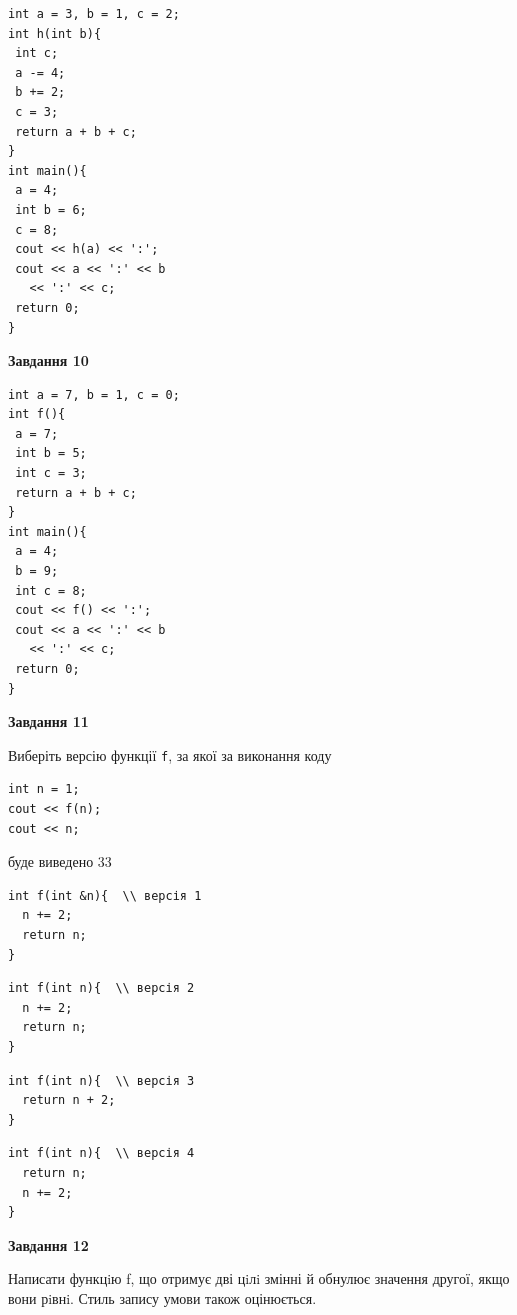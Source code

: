 \documentclass[12pt, ukrainian]{article}
\def\code#1{\Verb!#1!}
\begin{document}
{\begin {large}
\begin{minipage}[t]{7.0cm}
\begin{verbatim}
int a = 3, b = 1, c = 2;
int h(int b){
 int c;
 a -= 4;
 b += 2;
 c = 3;
 return a + b + c;
}
int main(){
 a = 4;
 int b = 6;
 c = 8;
 cout << h(a) << ':';
 cout << a << ':' << b 
   << ':' << c;
 return 0;
}
\end{verbatim}



\begin{center}
\textbf{Завдання 10}
\end{center}
\vspace{-8mm}

\begin{verbatim}
int a = 7, b = 1, c = 0;
int f(){
 a = 7;
 int b = 5;
 int c = 3;
 return a + b + c;
}
int main(){
 a = 4;
 b = 9;
 int c = 8;
 cout << f() << ':';
 cout << a << ':' << b 
   << ':' << c;
 return 0;
}
\end{verbatim}

\end{minipage}
\vline \hspace{1mm}
\begin{minipage}[t]{11.0cm}

\begin{center}
\textbf{Завдання 11}
\end{center}
Виберіть версію функції \code{f}, за якої за виконання коду
\begin{verbatim}
int n = 1;
cout << f(n);
cout << n;
\end{verbatim}

буде виведено 33

\begin{verbatim}
int f(int &n){  \\ версія 1
  n += 2;
  return n;
}
\end{verbatim}

\vspace{-8mm}\begin{verbatim}
int f(int n){  \\ версія 2
  n += 2;
  return n;
}
\end{verbatim}

\vspace{-8mm}\begin{verbatim}
int f(int n){  \\ версія 3
  return n + 2;
}
\end{verbatim}

\vspace{-8mm}\begin{verbatim}
int f(int n){  \\ версія 4
  return n;
  n += 2;
}
\end{verbatim}



\begin{center}
\textbf{Завдання 12}
\end{center}

Написати функцiю f, що отримує дві цiлi змінні й обнулює значення другої, якщо вони рiвнi. Стиль запису умови також оцінюється.\par

\end{minipage}

\end {large}}
\end{document}
